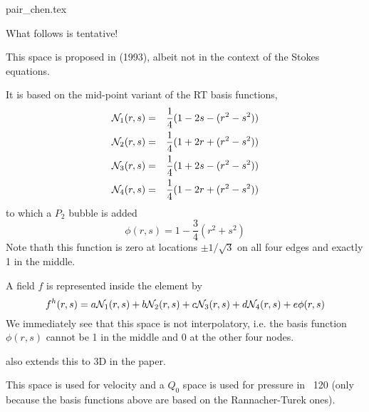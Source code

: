 \begin{flushright} {\tiny {\color{gray} pair\_chen.tex}} \end{flushright}

What follows is tentative!

This space is proposed in \textcite{chen93} (1993), albeit not in the 
context of the Stokes equations.

It is based on the mid-point variant of the RT basis functions, 
\begin{eqnarray}
{\mathcal{N}}_1(r,s) &=& \frac{1}{4} (1-2s-(r^2-s^2)) \nonumber\\
{\mathcal{N}}_2(r,s) &=& \frac{1}{4} (1+2r+(r^2-s^2)) \nonumber\\
{\mathcal{N}}_3(r,s) &=& \frac{1}{4} (1+2s-(r^2-s^2)) \nonumber\\
{\mathcal{N}}_4(r,s) &=& \frac{1}{4} (1-2r+(r^2-s^2)) \nonumber
\end{eqnarray}
to which a $P_2$ bubble is added
\[
\phi(r,s) = 1-\frac34(r^2+s^2)
\]
Note thath this function is zero at locations $\pm 1/\sqrt{3}$ 
on all four edges and exactly 1 in the middle. 

A field $f$ is represented inside the element by 
\[
f^h(r,s)=a {\mathcal{N}}_1(r,s)
+b {\mathcal{N}}_2(r,s)
+c {\mathcal{N}}_3(r,s)
+d {\mathcal{N}}_4(r,s)
+e \phi(r,s)
\]
We immediately see that this space is not interpolatory, i.e. the basis function $\phi(r,s)$ cannot be 1 in the middle and 0 at the other four nodes. 

\textcite{chen} also extends this to 3D in the paper. 

This space is used for velocity and a $Q_0$ space is used for 
pressure in \stone~120 (only because the basis functions above are
based on the Rannacher-Turek ones).
